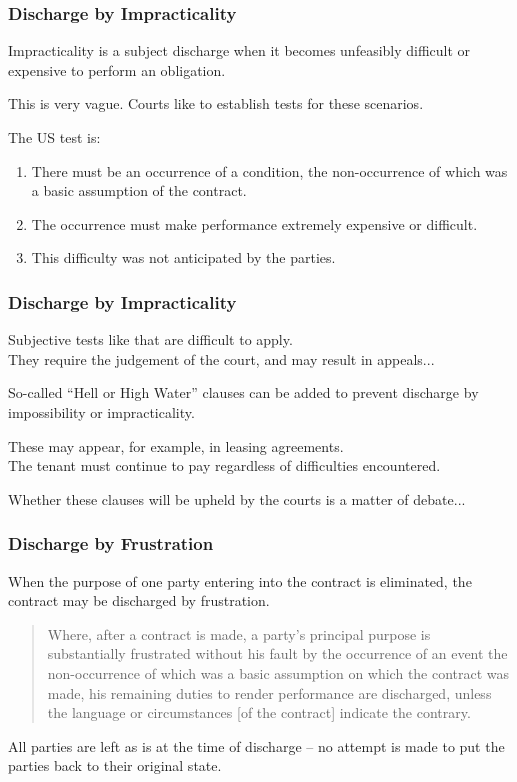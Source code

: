 \begin{frame}
\frametitle{Discharge by Impracticality}

Impracticality is a subject discharge when it becomes unfeasibly difficult or expensive to perform an obligation.

This is very vague. Courts like to establish tests for these scenarios.

The US test is:

\begin{enumerate}
	\item There must be an occurrence of a condition, the non-occurrence of which was a basic assumption of the contract.
	\item The occurrence must make performance extremely expensive or difficult.
	\item This difficulty was not anticipated by the parties.
\end{enumerate}

\end{frame}



\begin{frame}
\frametitle{Discharge by Impracticality}

Subjective tests like that are difficult to apply.\\
\quad They require the judgement of the court, and may result in appeals...

So-called ``Hell or High Water'' clauses can be added to prevent discharge by impossibility or impracticality.

These may appear, for example, in leasing agreements.\\
\quad The tenant must continue to pay regardless of difficulties encountered.

Whether these clauses will be upheld by the courts is a matter of debate...

\end{frame}



\begin{frame}
\frametitle{Discharge by Frustration}

When the purpose of one party entering into the contract is eliminated, the contract may be discharged by frustration.


\begin{quote}
   Where, after a contract is made, a party's principal purpose is substantially frustrated without his fault by the occurrence of an event the non-occurrence of which was a basic assumption on which the contract was made, his remaining duties to render performance are discharged, unless the language or circumstances [of the contract] indicate the contrary.
\end{quote}

All parties are left as is at the time of discharge -- no attempt is made to put the parties back to their original state.


\end{frame}



